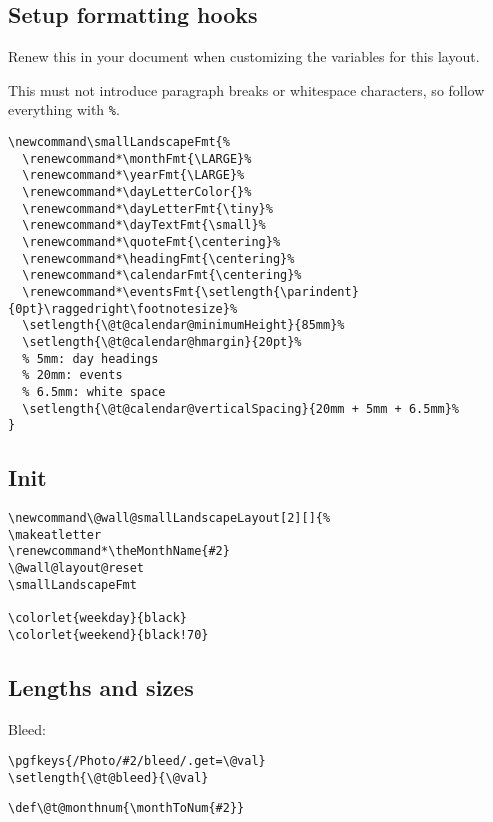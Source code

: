 \documentclass[11pt,oneside]{memoir-article}
\begin{document}
\subsection{Setup formatting hooks}
\label{sec:orgbe29f2c}

Renew this in your document when customizing the variables for this layout.

This must not introduce paragraph breaks or whitespace characters, so follow
everything with \texttt{\%}.

\begin{verbatim}
\newcommand\smallLandscapeFmt{%
  \renewcommand*\monthFmt{\LARGE}%
  \renewcommand*\yearFmt{\LARGE}%
  \renewcommand*\dayLetterColor{}%
  \renewcommand*\dayLetterFmt{\tiny}%
  \renewcommand*\dayTextFmt{\small}%
  \renewcommand*\quoteFmt{\centering}%
  \renewcommand*\headingFmt{\centering}%
  \renewcommand*\calendarFmt{\centering}%
  \renewcommand*\eventsFmt{\setlength{\parindent}{0pt}\raggedright\footnotesize}%
  \setlength{\@t@calendar@minimumHeight}{85mm}%
  \setlength{\@t@calendar@hmargin}{20pt}%
  % 5mm: day headings
  % 20mm: events
  % 6.5mm: white space
  \setlength{\@t@calendar@verticalSpacing}{20mm + 5mm + 6.5mm}%
}
\end{verbatim}

\subsection{Init}
\label{sec:org00f6cb7}

\begin{verbatim}
\newcommand\@wall@smallLandscapeLayout[2][]{%
\makeatletter
\renewcommand*\theMonthName{#2}
\@wall@layout@reset
\smallLandscapeFmt

\colorlet{weekday}{black}
\colorlet{weekend}{black!70}
\end{verbatim}

\subsection{Lengths and sizes}
\label{sec:orgc9577e9}

Bleed:

\begin{verbatim}
\pgfkeys{/Photo/#2/bleed/.get=\@val}
\setlength{\@t@bleed}{\@val}
\end{verbatim}

\begin{verbatim}
\def\@t@monthnum{\monthToNum{#2}}
\end{verbatim}
\end{document}
